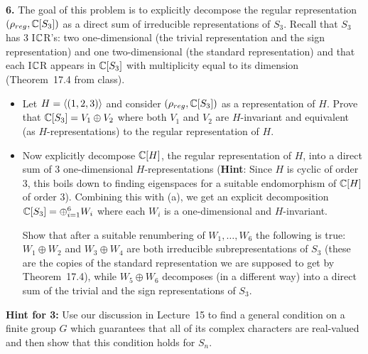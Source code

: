 \documentclass[11pt]{amsart}
\begin{document}
\skv
{\bf 6.} The goal of this problem is to explicitly decompose the regular representation $(\rho_{reg},{\mathbb C}[S_3])$ as a direct sum of irreducible representations of $S_3$. Recall that
$S_3$ has 3 I${\mathbb C}$R's: two one-dimensional (the trivial representation and the sign representation) and one two-dimensional (the standard representation) and that each I${\mathbb C}$R appears in ${\mathbb C}[S_3]$ with multiplicity equal to its dimension (Theorem~17.4 from class).
\begin{itemize}
\item[(a)] Let $H={\langle} (1,2,3){\rangle}$ and consider $(\rho_{reg},{\mathbb C}[S_3])$ as a representation of $H$. Prove that ${\mathbb C}[S_3]=V_1\oplus V_2$ where both 
$V_1$ and $V_2$ are $H$-invariant and equivalent (as $H$-representations) 
to the regular representation of $H$.
\item[(b)]  Now explicitly decompose ${\mathbb C}[H]$, the regular representation of $H$, into a direct sum of 3 one-dimensional $H$-representations
({\bf Hint}: Since $H$ is cyclic of order $3$, this boils down to finding eigenspaces for a suitable endomorphism of ${\mathbb C}[H]$ of order $3$).
Combining this with (a), we get an explicit decomposition
${\mathbb C}[S_3]=\oplus_{i=1}^6 W_i$ where each $W_i$ is a one-dimensional 
and $H$-invariant. 

Show that after a suitable renumbering of $W_1,\ldots, W_6$
the following is true: $W_1\oplus W_2$ and $W_3\oplus W_4$ are both irreducible
subrepresentations of $S_3$ (these are the copies of the standard representation we are supposed to get by Theorem~17.4), while $W_5\oplus W_6$ decomposes (in a different way) into a direct sum of the trivial and the sign representations of $S_3$. 
\end{itemize}
\skv

\newpage
{\bf Hint for 3:} Use our discussion in Lecture~15 to find a general condition on a finite group $G$ which guarantees that all of its complex characters are real-valued and then show that this condition holds for $S_n$.
\end{document}
